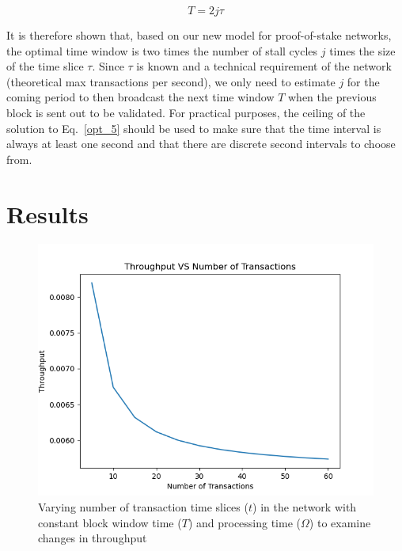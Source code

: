 \documentclass[conference]{IEEEtran}
\begin{document}
\begin{equation}
  T=2j\tau \label{opt_5}
\end{equation}

It is therefore shown that, based on our new model for proof-of-stake networks, the optimal 
time window is two times the number of stall cycles $j$ times the size of the time slice $\tau$.
Since $\tau$ is known and a technical requirement of the network (theoretical max transactions
per second), we only need to estimate $j$ for the coming period to then broadcast the next time 
window $T$ when the previous block is sent out to be validated. For practical purposes, the 
ceiling of the solution to Eq.~\ref{opt_5} should be used to make sure that the time interval is always at least one
second and that there are discrete second intervals to choose from.
\fi

\section{Results}\label{results}

\begin{figure}[htbp]
    \centerline{\includegraphics[width=\linewidth]{Figures/ThroughputVSNoOfTrnxConstOmega.png}}
    \caption{Varying number of transaction time slices ($t$) in the network with constant block window time ($T$) and processing time ($\Omega$) to examine changes in throughput}
    \label{TP_trans}
\end{figure}
\end{document}
